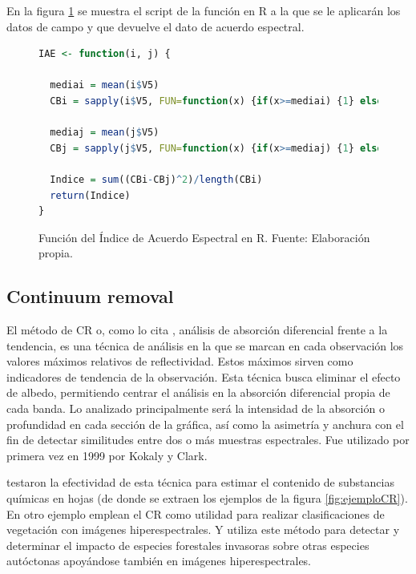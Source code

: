 En la figura \ref{fig:IAE} se muestra el script de la función en R a la que se le aplicarán los datos de campo y que devuelve el dato de acuerdo espectral.

\begin{figure}
\centering
\begin{lstlisting}[language = R, frame = single]
  IAE <- function(i, j) {
  
  mediai = mean(i$V5)
  CBi = sapply(i$V5, FUN=function(x) {if(x>=mediai) {1} else {0}})
  
  mediaj = mean(j$V5)
  CBj = sapply(j$V5, FUN=function(x) {if(x>=mediaj) {1} else {0}})
  	
  Indice = sum((CBi-CBj)^2)/length(CBi)
  return(Indice)  
}
\end{lstlisting}
\caption[Función de Índice de Acuerdo Espectral]{Función del Índice de Acuerdo Espectral en R. Fuente: Elaboración propia.}
\label{fig:IAE}
\end{figure}

\subsection{Continuum removal}
\label{subsec:Continuum_removal}

El método de \ac{CR} o, como lo cita \cite{chuvieco2002teledeteccion}, análisis de absorción diferencial frente a la tendencia, es una técnica de análisis en la que se marcan en cada observación los valores máximos relativos de reflectividad. Estos máximos sirven como indicadores de tendencia de la observación. Esta técnica busca eliminar el efecto de albedo, permitiendo centrar el análisis en la absorción diferencial propia de cada banda. Lo analizado principalmente será la intensidad de la absorción o profundidad en cada sección de la gráfica, así como la asimetría y anchura con el fin de detectar similitudes entre dos o más muestras espectrales. Fue utilizado por primera vez en 1999 por Kokaly y Clark.\Sep

\cite{huang2004estimating} testaron la efectividad de esta técnica para estimar el contenido de substancias químicas en hojas (de donde se extraen los ejemplos de la figura \ref{fig:ejemploCR}). En otro ejemplo \cite{filippi2007effect} emplean el \ac{CR} como utilidad para realizar clasificaciones de vegetación con imágenes hiperespectrales. Y \cite{underwood2003mapping} utiliza este método para detectar y determinar el impacto de especies forestales invasoras sobre otras especies autóctonas apoyándose también en imágenes hiperespectrales.

